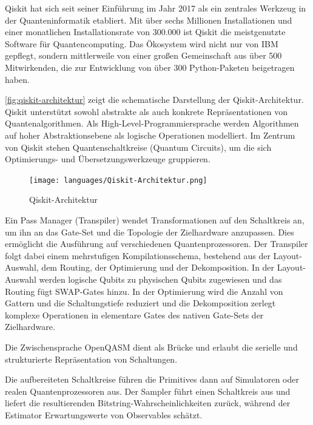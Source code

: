 Qiskit hat sich seit seiner Einführung im Jahr 2017 als ein zentrales Werkzeug in der Quanteninformatik etabliert. Mit über sechs Millionen Installationen und einer monatlichen Installationsrate von 300.000 ist Qiskit die meistgenutzte Software für Quantencomputing. Das Ökosystem wird nicht nur von IBM gepflegt, sondern mittlerweile von einer großen Gemeinschaft aus über 500 Mitwirkenden, die zur Entwicklung von über 300 Python-Paketen beigetragen haben. \autocite{javadi-abhariQuantumComputingQiskit2024a}

\autoref{fig:qiskit-architektur} zeigt die schematische Darstellung der Qiskit-Architektur. Qiskit unterstützt sowohl abstrakte als auch konkrete Repräsentationen von Quantenalgorithmen. Als High-Level-Programmiersprache werden Algorithmen auf hoher Abstraktionsebene als logische Operationen modelliert. Im Zentrum von Qiskit stehen Quantenschaltkreise (Quantum Circuits), um die sich Optimierungs- und Übersetzungswerkzeuge gruppieren. \autocite{javadi-abhariQuantumComputingQiskit2024a}

\begin{figure}[ht!]
    \centering
    \texttt{[image: languages/Qiskit-Architektur.png]}
    \caption{Qiskit-Architektur \autocite{javadi-abhariQuantumComputingQiskit2024a}}
    \label{fig:qiskit-architektur}
\end{figure}

Ein Pass Manager (Transpiler) wendet Transformationen auf den Schaltkreis an, um ihn an das Gate-Set und die Topologie der Zielhardware anzupassen. Dies ermöglicht die Ausführung auf verschiedenen Quantenprozessoren. Der Transpiler folgt dabei einem mehrstufigen Kompilationsschema, bestehend aus der Layout-Auswahl, dem Routing, der Optimierung und der Dekomposition. In der Layout-Auswahl werden logische Qubits zu physischen Qubits zugewiesen und das Routing fügt SWAP-Gates hinzu. In der Optimierung wird die Anzahl von Gattern und die Schaltungstiefe reduziert und die Dekomposition zerlegt komplexe Operationen in elementare Gates des nativen Gate-Sets der Zielhardware. \autocite{javadi-abhariQuantumComputingQiskit2024a}

Die Zwischensprache OpenQASM dient als Brücke und erlaubt die serielle und strukturierte Repräsentation von Schaltungen. \autocite{crossOpenQuantumAssembly2017a}

Die aufbereiteten Schaltkreise führen die Primitives dann auf Simulatoren oder realen Quantenprozessoren aus. Der Sampler führt einen Schaltkreis aus und liefert die resultierenden Bitstring-Wahrscheinlichkeiten zurück, während der Estimator Erwartungswerte von Observables schätzt.


